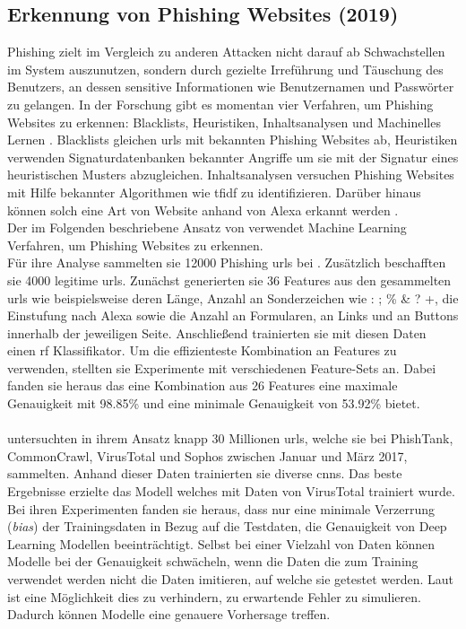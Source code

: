 \documentclass[
    12pt, %
    DIV10,
    ngerman, %
    a4paper, %
    oneside, %
    titlepage, %
    parskip=half, %
    headings=normal, %
    listof=totoc, %
    bibliography=totoc, %
    index=totoc, %
    captions=tableheading, %
    final %
]{scrreprt}
\begin{document}
\subsection{Erkennung von Phishing Websites (2019)}
Phishing zielt im Vergleich zu anderen Attacken nicht darauf ab Schwachstellen im System auszunutzen, sondern durch gezielte Irreführung und Täuschung des Benutzers, an dessen sensitive Informationen wie Benutzernamen und Passwörter zu gelangen.
In der Forschung gibt es momentan vier Verfahren, um Phishing Websites zu erkennen: Blacklists, Heuristiken, Inhaltsanalysen und Machinelles Lernen \parencite{Alswailem2019}. Blacklists gleichen \ac{urls} mit bekannten Phishing Websites ab, Heuristiken verwenden Signaturdatenbanken bekannter Angriffe um sie mit der Signatur eines heuristischen Musters abzugleichen. Inhaltsanalysen versuchen Phishing Websites mit Hilfe bekannter Algorithmen wie \ac{tfidf} zu identifizieren. Darüber hinaus können solch eine Art von Website anhand von Alexa erkannt werden \parencite{nguyen2013detecting}. \\
Der im Folgenden beschriebene Ansatz von \textcite{Alswailem2019} verwendet Machine Learning Verfahren, um Phishing Websites zu erkennen.\\
Für ihre Analyse sammelten sie 12000 Phishing \ac{urls} bei \textcite{PhishTank}. Zusätzlich beschafften sie 4000 legitime \ac{urls}. Zunächst generierten sie 36 Features aus den gesammelten \ac{urls} wie beispielsweise deren Länge, Anzahl an Sonderzeichen wie : ; \% \& ? +, die Einstufung nach Alexa sowie die Anzahl an Formularen, an Links und an Buttons innerhalb der jeweiligen Seite. Anschlie{\ss}end trainierten sie mit diesen Daten einen \ac{rf} Klassifikator. Um die effizienteste Kombination an Features zu verwenden, stellten sie Experimente mit verschiedenen Feature-Sets an. Dabei fanden sie heraus das eine Kombination aus 26 Features eine maximale Genauigkeit mit 98.85\% und eine minimale Genauigkeit von 53.92\% bietet. 
\\\\
\textcite{Hillary2017} untersuchten in ihrem Ansatz knapp 30 Millionen \ac{urls}, welche sie bei PhishTank, CommonCrawl, VirusTotal und Sophos zwischen Januar und März 2017, sammelten. Anhand dieser Daten trainierten sie diverse \ac{cnns}. Das beste Ergebnisse erzielte das Modell welches mit Daten von VirusTotal trainiert wurde. Bei ihren Experimenten fanden sie heraus, dass nur eine minimale Verzerrung (\emph{bias}) der Trainingsdaten in Bezug auf die Testdaten, die Genauigkeit von Deep Learning Modellen beeinträchtigt. Selbst bei einer Vielzahl von Daten können Modelle bei der Genauigkeit schwächeln, wenn die Daten die zum Training verwendet werden nicht die Daten imitieren, auf welche sie getestet werden. Laut \textcite{Hillary2017} ist eine Möglichkeit dies zu verhindern, zu erwartende Fehler zu simulieren. Dadurch können Modelle eine genauere Vorhersage treffen.
%
\end{document}
